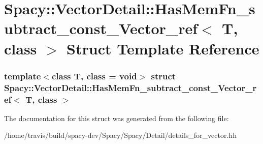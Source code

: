 \hypertarget{structSpacy_1_1VectorDetail_1_1HasMemFn__subtract__const__Vector__ref}{\section{\-Spacy\-:\-:\-Vector\-Detail\-:\-:\-Has\-Mem\-Fn\-\_\-subtract\-\_\-const\-\_\-\-Vector\-\_\-ref$<$ \-T, class $>$ \-Struct \-Template \-Reference}
\label{structSpacy_1_1VectorDetail_1_1HasMemFn__subtract__const__Vector__ref}
}
\subsubsection*{template$<$class T, class = void$>$ struct Spacy\-::\-Vector\-Detail\-::\-Has\-Mem\-Fn\-\_\-subtract\-\_\-const\-\_\-\-Vector\-\_\-ref$<$ T, class $>$}



\-The documentation for this struct was generated from the following file\-:\begin{DoxyCompactItemize}
\item 
/home/travis/build/spacy-\/dev/\-Spacy/\-Spacy/\-Detail/details\-\_\-for\-\_\-vector.\-hh\end{DoxyCompactItemize}
